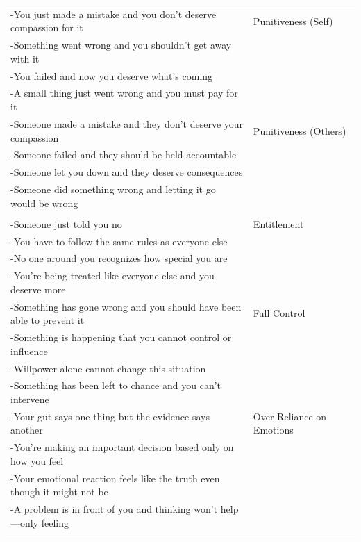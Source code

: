 \documentclass[11pt,oneside]{book}
\begin{document}
\begin{longtable}{>{\raggedright}p{} p{}}
-You just made a mistake and you don't deserve compassion for it & Punitiveness (Self) \\
-Something went wrong and you shouldn't get away with it &  \\
-You failed and now you deserve what's coming &  \\
-A small thing just went wrong and you must pay for it &  \\
\addlinespace

-Someone made a mistake and they don't deserve your compassion & Punitiveness (Others) \\
-Someone failed and they should be held accountable &  \\
-Someone let you down and they deserve consequences &  \\
-Someone did something wrong and letting it go would be wrong &  \\

\midrule
\multicolumn{2}{l}{\textbf{Realistic \& Consistent Limits}} \\
\midrule

-Someone just told you no & Entitlement \\
-You have to follow the same rules as everyone else &  \\
-No one around you recognizes how special you are &  \\
-You're being treated like everyone else and you deserve more &  \\
\addlinespace

-Something has gone wrong and you should have been able to prevent it & Full Control \\
-Something is happening that you cannot control or influence &  \\
-Willpower alone cannot change this situation &  \\
-Something has been left to chance and you can't intervene &  \\
\addlinespace

-Your gut says one thing but the evidence says another & Over-Reliance on Emotions \\
-You're making an important decision based only on how you feel &  \\
-Your emotional reaction feels like the truth even though it might not be &  \\
-A problem is in front of you and thinking won't help---only feeling &  \\

\midrule
\multicolumn{2}{l}{\textbf{Coherence \& Fairness}} \\
\midrule


\end{longtable}
\end{document}
